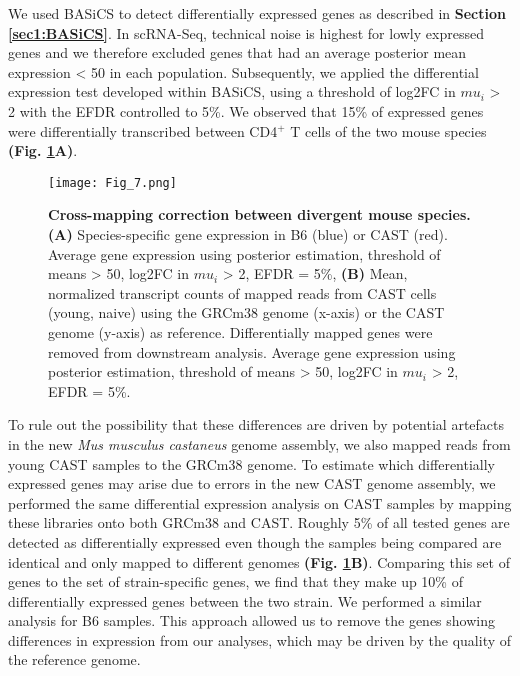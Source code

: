 We used BASiCS \citep{Vallejos2016} to detect differentially expressed genes as described in \textbf{Section \ref{sec1:BASiCS}}. In scRNA-Seq, technical noise is highest for lowly expressed genes \citep{Brennecke2013} and we therefore excluded genes that had an average posterior mean expression < 50 in each population. Subsequently, we applied the differential expression test developed within BASiCS, using a threshold of log2FC in $mu_i$ > 2 with the EFDR controlled to 5\%. We observed that 15\% of expressed genes were differentially transcribed between CD4$^+$ T cells of the two mouse species \textbf{(Fig. \ref{fig1:spec_spec_mapping}A)}. 

\begin{figure}[!hb]
\centering
\texttt{[image: Fig\_7.png]}
\caption[Cross-mapping correction between divergent mouse species]{\textbf{Cross-mapping correction between divergent mouse species.}\\
\textbf{(A)} Species-specific gene expression in B6 (blue) or CAST (red). Average gene expression using posterior estimation, threshold of means > 50, log2FC in $mu_i$ > 2, EFDR = 5\%, \textbf{(B)} Mean, normalized transcript counts of mapped reads from CAST cells (young, naive) using the GRCm38 genome (x-axis) or the CAST genome (y-axis) as reference. Differentially mapped genes were removed from downstream analysis. Average gene expression using posterior estimation, threshold of means > 50, log2FC in $mu_i$ > 2, EFDR = 5\%.
}
\label{fig1:spec_spec_mapping}
\end{figure}

To rule out the possibility that these differences are driven by potential artefacts in the new \textit{Mus musculus castaneus} genome assembly, we also mapped reads from young CAST samples to the GRCm38 genome. To estimate which differentially expressed genes may arise due to errors in the new CAST genome assembly, we performed the same differential expression analysis on CAST samples by mapping these libraries onto both GRCm38 and CAST. Roughly 5\% of all tested genes are detected as differentially expressed even though the samples being compared are identical and only mapped to different genomes \textbf{(Fig. \ref{fig1:spec_spec_mapping}B)}. Comparing this set of genes to the set of strain-specific genes, we find that they make up 10\% of differentially expressed genes between the two strain. We performed a similar analysis for B6 samples. This approach allowed us to remove the genes showing differences in expression from our analyses, which may be driven by the quality of the reference genome.

